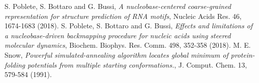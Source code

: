 \documentclass{article}
\begin{document}



\begin{thebibliography}{99}
   S. Poblete, S. Bottaro and G. Bussi, {\it A nucleobase-centered coarse-grained representation for structure prediction of RNA motifs}, Nucleic Acids Res. 46, 1674-1683 (2018).
   S. Poblete, S. Bottaro and G. Bussi, {\it Effects and limitations of a nucleobase-driven backmapping procedure for nucleic acids using steered molecular dynamics}, Biochem. Biophys. Res. Comm. 498, 352-358 (2018).
     M. E. Snow, {\it Powerful simulated-annealing algorithm locates global minimum of protein-folding potentials from multiple starting conformations.}, J. Comput. Chem. 13, 579-584 (1991).
\end{thebibliography}
\end{document}
